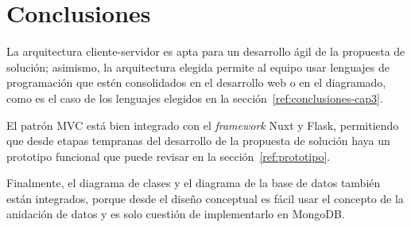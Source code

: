 \section{Conclusiones}

La arquitectura cliente-servidor es apta para un desarrollo ágil de la propuesta de solución; asimismo, la arquitectura elegida permite al equipo usar lenguajes de programación que estén consolidados en el desarrollo web o en el diagramado, como es el caso de los lenguajes elegidos en la sección~\ref{ref:conclusiones-cap3}.


El patrón MVC está bien integrado con el \textit{framework} Nuxt y Flask, permitiendo que desde etapas tempranas del desarrollo de la propuesta de solución haya un prototipo funcional que puede revisar en la sección~\ref{ref:prototipo}.


Finalmente, el diagrama de clases y el diagrama de la base de datos también están integrados, porque desde el diseño conceptual es fácil usar el concepto de la anidación de datos y es solo cuestión de implementarlo en MongoDB.